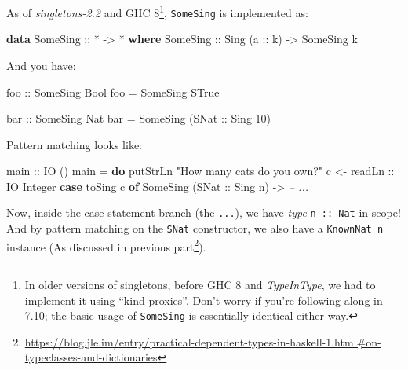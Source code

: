 \documentclass[]{article}
\newenvironment{Shaded}{}{}
\newcommand{\CommentTok}[1]{\textcolor[rgb]{0.38,0.63,0.69}{\textit{#1}}}
\newcommand{\DataTypeTok}[1]{\textcolor[rgb]{0.56,0.13,0.00}{#1}}
\newcommand{\DecValTok}[1]{\textcolor[rgb]{0.25,0.63,0.44}{#1}}
\newcommand{\FunctionTok}[1]{\textcolor[rgb]{0.02,0.16,0.49}{#1}}
\newcommand{\KeywordTok}[1]{\textcolor[rgb]{0.00,0.44,0.13}{\textbf{#1}}}
\newcommand{\NormalTok}[1]{#1}
\newcommand{\OtherTok}[1]{\textcolor[rgb]{0.00,0.44,0.13}{#1}}
\newcommand{\StringTok}[1]{\textcolor[rgb]{0.25,0.44,0.63}{#1}}
\renewcommand{\href}[2]{#2\footnote{\url{#1}}}
\begin{document}
As of \emph{singletons-2.2} and GHC 8\footnote{In older versions of singletons,
  before GHC 8 and \emph{TypeInType}, we had to implement it using ``kind
  proxies''. Don't worry if you're following along in 7.10; the basic usage of
  \texttt{SomeSing} is essentially identical either way.}, \texttt{SomeSing} is
implemented as:

\begin{Shaded}
\begin{Highlighting}[]
\KeywordTok{data} \DataTypeTok{SomeSing}\OtherTok{ ::} \FunctionTok{*} \OtherTok{->} \FunctionTok{*} \KeywordTok{where}
    \DataTypeTok{SomeSing}\OtherTok{ ::} \DataTypeTok{Sing}\NormalTok{ (}\OtherTok{a ::}\NormalTok{ k) }\OtherTok{->} \DataTypeTok{SomeSing}\NormalTok{ k}
\end{Highlighting}
\end{Shaded}

And you have:

\begin{Shaded}
\begin{Highlighting}[]
\OtherTok{foo ::} \DataTypeTok{SomeSing} \DataTypeTok{Bool}
\NormalTok{foo }\FunctionTok{=} \DataTypeTok{SomeSing} \DataTypeTok{STrue}

\OtherTok{bar ::} \DataTypeTok{SomeSing} \DataTypeTok{Nat}
\NormalTok{bar }\FunctionTok{=} \DataTypeTok{SomeSing}\NormalTok{ (}\DataTypeTok{SNat}\OtherTok{ ::} \DataTypeTok{Sing} \DecValTok{10}\NormalTok{)}
\end{Highlighting}
\end{Shaded}

Pattern matching looks like:

\begin{Shaded}
\begin{Highlighting}[]
\OtherTok{main ::} \DataTypeTok{IO}\NormalTok{ ()}
\NormalTok{main }\FunctionTok{=} \KeywordTok{do}
\NormalTok{    putStrLn }\StringTok{"How many cats do you own?"}
\NormalTok{    c }\OtherTok{<- readLn ::} \DataTypeTok{IO} \DataTypeTok{Integer}
    \KeywordTok{case}\NormalTok{ toSing c }\KeywordTok{of}
      \DataTypeTok{SomeSing}\NormalTok{ (}\DataTypeTok{SNat}\OtherTok{ ::} \DataTypeTok{Sing}\NormalTok{ n) }\OtherTok{->} \CommentTok{-- ...}
\end{Highlighting}
\end{Shaded}

Now, inside the case statement branch (the \texttt{...}), we have \emph{type}
\texttt{n\ ::\ Nat} in scope! And by pattern matching on the \texttt{SNat}
constructor, we also have a \texttt{KnownNat\ n} instance (As discussed in
\href{https://blog.jle.im/entry/practical-dependent-types-in-haskell-1.html\#on-typeclasses-and-dictionaries}{previous
part}).
\end{document}
